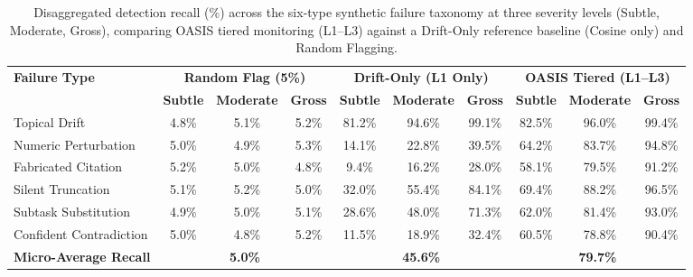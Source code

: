 \begin{table}[t]
\centering
\small
\caption{Disaggregated detection recall (\%) across the six-type synthetic failure taxonomy at three severity levels (Subtle, Moderate, Gross), comparing OASIS tiered monitoring (L1--L3) against a Drift-Only reference baseline (Cosine only) and Random Flagging.}
\label{tab:failure_recall}
\begin{tabular}{lccccccccc}
\toprule
\textbf{Failure Type} & \multicolumn{3}{c}{\textbf{Random Flag (5\%)}} & \multicolumn{3}{c}{\textbf{Drift-Only (L1 Only)}} & \multicolumn{3}{c}{\textbf{OASIS Tiered (L1--L3)}} \\
\cmidrule(lr){2-4} \cmidrule(lr){5-7} \cmidrule(lr){8-10}
 & \textbf{Subtle} & \textbf{Moderate} & \textbf{Gross} & \textbf{Subtle} & \textbf{Moderate} & \textbf{Gross} & \textbf{Subtle} & \textbf{Moderate} & \textbf{Gross} \\
\midrule
Topical Drift & 4.8\% & 5.1\% & 5.2\% & 81.2\% & 94.6\% & 99.1\% & 82.5\% & 96.0\% & 99.4\% \\
Numeric Perturbation & 5.0\% & 4.9\% & 5.3\% & 14.1\% & 22.8\% & 39.5\% & 64.2\% & 83.7\% & 94.8\% \\
Fabricated Citation & 5.2\% & 5.0\% & 4.8\% & 9.4\% & 16.2\% & 28.0\% & 58.1\% & 79.5\% & 91.2\% \\
Silent Truncation & 5.1\% & 5.2\% & 5.0\% & 32.0\% & 55.4\% & 84.1\% & 69.4\% & 88.2\% & 96.5\% \\
Subtask Substitution & 4.9\% & 5.0\% & 5.1\% & 28.6\% & 48.0\% & 71.3\% & 62.0\% & 81.4\% & 93.0\% \\
Confident Contradiction & 5.0\% & 4.8\% & 5.2\% & 11.5\% & 18.9\% & 32.4\% & 60.5\% & 78.8\% & 90.4\% \\
\midrule
\textbf{Micro-Average Recall} & \multicolumn{3}{c}{\textbf{5.0\%}} & \multicolumn{3}{c}{\textbf{45.6\%}} & \multicolumn{3}{c}{\textbf{79.7\%}} \\
\bottomrule
\end{tabular}
\end{table}
